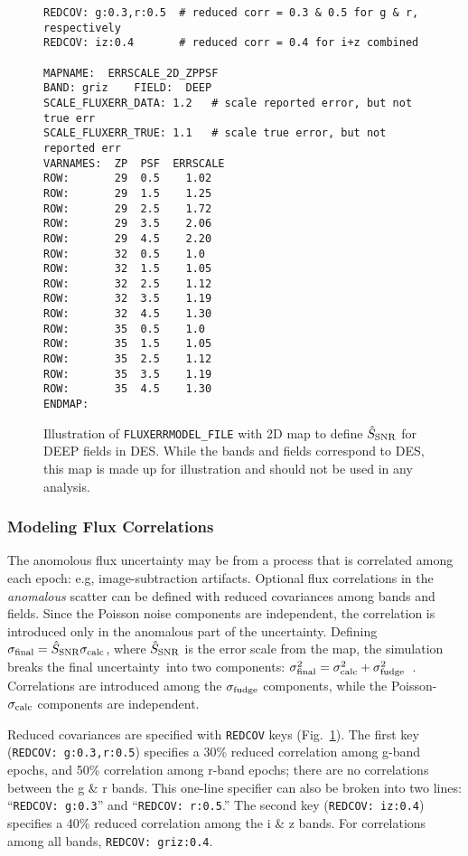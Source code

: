 \documentclass[12pt]{article}
\newcommand{\unc}{uncertainty}
\newcommand{\SSNR}{\hat{S}_{\rm SNR}}
\begin{document}
{\begin{figure} [hb]
\begin{center}
\begin{Verbatim}[frame=single]
REDCOV: g:0.3,r:0.5  # reduced corr = 0.3 & 0.5 for g & r, respectively
REDCOV: iz:0.4       # reduced corr = 0.4 for i+z combined

MAPNAME:  ERRSCALE_2D_ZPPSF
BAND: griz    FIELD:  DEEP 
SCALE_FLUXERR_DATA: 1.2   # scale reported error, but not true err
SCALE_FLUXERR_TRUE: 1.1   # scale true error, but not reported err
VARNAMES:  ZP  PSF  ERRSCALE
ROW:       29  0.5    1.02
ROW:       29  1.5    1.25
ROW:       29  2.5    1.72
ROW:       29  3.5    2.06 
ROW:       29  4.5    2.20
ROW:       32  0.5    1.0
ROW:       32  1.5    1.05
ROW:       32  2.5    1.12
ROW:       32  3.5    1.19 
ROW:       32  4.5    1.30
ROW:       35  0.5    1.0
ROW:       35  1.5    1.05
ROW:       35  2.5    1.12
ROW:       35  3.5    1.19 
ROW:       35  4.5    1.30
ENDMAP:
\end{Verbatim}
\end{center}
\caption{
  Illustration of {\tt FLUXERRMODEL\_FILE} with 2D map to 
  define $\SSNR$ for DEEP fields in DES.
  While the bands and fields correspond to DES, this map is made up
  for illustration and  should not be used in any analysis.
 }
\label{fig:fluxerrmap_2D}
\end{figure}

\clearpage
\subsubsection{Modeling Flux Correlations }
\label{sss:fluxCov}

The anomolous flux uncertainty may be from a process that is 
correlated among each epoch: e.g, image-subtraction artifacts. 
Optional flux correlations in the {\it anomalous} scatter can be 
defined with reduced covariances among bands and fields.
Since the Poisson noise components are independent,
the correlation is introduced only in the anomalous part of
the uncertainty. Defining $\sigma_{\rm final} = \SSNR \sigma_{\rm calc}$,
where $\SSNR$ is the error scale from the map, the simulation
breaks the final \unc\ into two components:
%
 $\sigma_{\rm final}^2 = \sigma_{\rm calc}^2 + \sigma_{\rm fudge}^2$~.
%
Correlations are introduced among the $\sigma_{\rm fudge}$ components, 
while the Poisson-$\sigma_{\rm calc}$ components are independent.


Reduced covariances are specified with  {\tt REDCOV} 
keys (Fig.~\ref{fig:fluxerrmap_2D}).
The first key ({\tt REDCOV: g:0.3,r:0.5}) specifies a 30\% 
reduced correlation among g-band epochs, and 50\% correlation
among r-band epochs; there are no correlations
between the g \& r bands.  This one-line specifier can 
also be broken into two lines: ``{\tt REDCOV: g:0.3}'' and 
``{\tt REDCOV: r:0.5}.''
The second key ({\tt REDCOV: iz:0.4}) specifies a 40\%
reduced correlation among the i \& z bands. 
For correlations among all bands, {\tt REDCOV: griz:0.4}.

}
\end{document}
